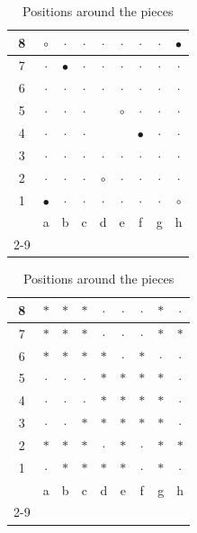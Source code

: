 \documentclass[12pt,a4paper,twoside,openright]{book}
\begin{document}
\begin{table}[H]
\centering
\begin{minipage}{0.45\textwidth}
\centering
\caption{Game board}
\label{tab:before_all_shift}
\begin{tabular}{|c|c|c|c|c|c|c|c|c|}
\hline
8 & $\circ$ & $\cdot$ & $\cdot$ & $\cdot$ & $\cdot$ & $\cdot$ & $\cdot$ & $\bullet$ \\ \hline
7 & $\cdot$ & $\bullet$ & $\cdot$ & $\cdot$ & $\cdot$ & $\cdot$ & $\cdot$ & $\cdot$ \\ \hline
6 & $\cdot$ & $\cdot$ & $\cdot$ & $\cdot$ & $\cdot$ & $\cdot$ & $\cdot$ & $\cdot$ \\ \hline
5 & $\cdot$ & $\cdot$ & $\cdot$ & \raisebox{-0.3ex}{$\blacksquare$} & $\circ$ & $\cdot$ & $\cdot$ & $\cdot$ \\ \hline
4 & $\cdot$ & $\cdot$ & $\cdot$ & \raisebox{-0.3ex}{$\blacksquare$} & \raisebox{-0.3ex}{$\blacksquare$} & $\bullet$ & $\cdot$ & $\cdot$ \\ \hline
3 & $\cdot$ & $\cdot$ & $\cdot$ & $\cdot$ & $\cdot$ & $\cdot$ & $\cdot$ & $\cdot$ \\ \hline
2 & $\cdot$ & $\cdot$ & $\cdot$ & $\circ$ & $\cdot$ & $\cdot$ & $\cdot$ & $\cdot$ \\ \hline
1 & $\bullet$ & $\cdot$ & $\cdot$ & $\cdot$ & $\cdot$ & $\cdot$ & $\cdot$ & $\circ$ \\ \hline
\multicolumn{1}{c|}{} & a & b & c & d & e & f & g & h \\
\cline{2-9}
\end{tabular}
\end{minipage}
\hfill
\begin{minipage}{0.45\textwidth}
\centering
\caption{Positions around the pieces}
\label{tab:after_all_shift}
\begin{tabular}{|c|c|c|c|c|c|c|c|c|}
\hline
8 & $\ast$ & $\ast$ & $\ast$ & $\cdot$ & $\cdot$ & $\cdot$ & $\ast$ & $\cdot$ \\ \hline
7 & $\ast$ & $\ast$ & $\ast$ & $\cdot$ & $\cdot$ & $\cdot$ & $\ast$ & $\ast$ \\ \hline
6 & $\ast$ & $\ast$ & $\ast$ & $\ast$ & $\cdot$ & $\ast$ & $\cdot$ & $\cdot$ \\ \hline
5 & $\cdot$ & $\cdot$ & $\cdot$ & $\ast$ & $\ast$ & $\ast$ & $\ast$ & $\cdot$ \\ \hline
4 & $\cdot$ & $\cdot$ & $\cdot$ & $\ast$ & $\ast$ & $\ast$ & $\ast$ & $\cdot$ \\ \hline
3 & $\cdot$ & $\cdot$ & $\ast$ & $\ast$ & $\ast$ & $\ast$ & $\ast$ & $\cdot$ \\ \hline
2 & $\ast$ & $\ast$ & $\ast$ & $\cdot$ & $\ast$ & $\cdot$ & $\ast$ & $\ast$ \\ \hline
1 & $\cdot$ & $\ast$ & $\ast$ & $\ast$ & $\ast$ & $\cdot$ & $\ast$ & $\cdot$ \\ \hline
\multicolumn{1}{c|}{} & a & b & c & d & e & f & g & h \\
\cline{2-9}
\end{tabular}
\end{minipage}
\end{table}
\end{document}
